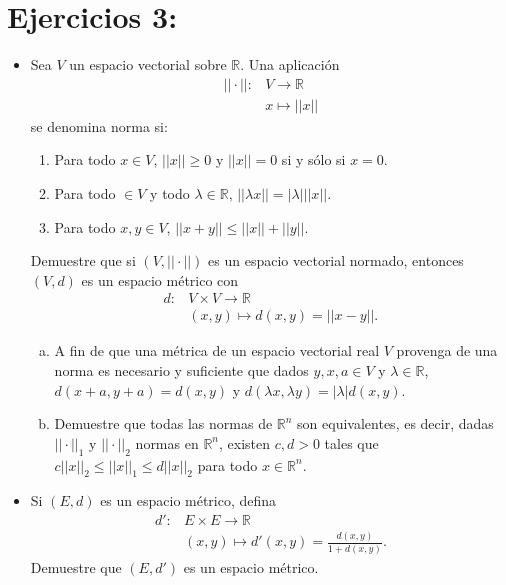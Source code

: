 \section{Ejercicios 3:}
\begin{itemize}[leftmargin=*]
    \item Sea $V$ un espacio vectorial sobre $\mathbb{R}$. Una aplicación 
        \begin{align*}
            ||\cdot||:&V \longrightarrow \mathbb{R}\\
            &x \longmapsto ||x||
        \end{align*}
        se denomina norma si:
        \begin{enumerate}[(1)]
            \item Para todo $x \in V$, $||x||\geq 0$ y $||x||=0$ si y sólo si $x=0$.
            \item Para todo $ \in V$ y todo $\lambda \in \mathbb{R}$, $||\lambda x||=|\lambda|||x||$.
            \item Para todo $x,y \in V$, $||x+y||\leq ||x||+||y||$.
        \end{enumerate}
        Demuestre que si $(V,||\cdot||)$ es un espacio vectorial normado, entonces $(V,d)$ es un espacio métrico con 
        \begin{align*}
            d:&V \times V \longrightarrow \mathbb{R}\\
            &(x,y) \longmapsto d(x,y)=||x-y||.
        \end{align*}
        \begin{enumerate}[a)]
            \item A fin de que una métrica de un espacio vectorial real $V$ provenga de una norma es necesario y suficiente que dados $y,x,a \in V$ y $\lambda \in \mathbb{R}$, $d(x+a,y+a)=d(x,y)$ y $d(\lambda x,\lambda y)=|\lambda|d(x,y)$.
            \item Demuestre que todas las normas de $\mathbb{R}^n$ son equivalentes, es decir, dadas $||\cdot||_1$ y $||\cdot||_2$ normas en $\mathbb{R}^n$, existen $c,d>0$ tales que $c||x||_2\leq ||x||_1\leq d||x||_2$ para todo $x \in \mathbb{R}^n$.
        \end{enumerate}
    \item Si $(E,d)$ es un espacio métrico, defina
    \begin{align*}
        d': &E \times E \longrightarrow \mathbb{R}\\
        &(x,y) \longmapsto d'(x,y)=\frac{d(x,y)}{1+d(x,y)}.
    \end{align*}
    Demuestre que $(E,d')$ es un espacio métrico.\\
    

\end{itemize}
